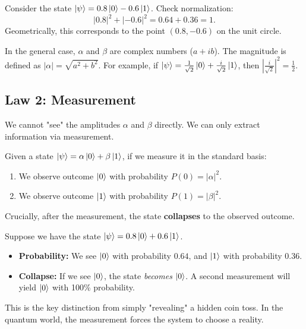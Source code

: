 \begin{example}
Consider the state $\ket{\psi} = 0.8\ket{0} - 0.6\ket{1}$.
Check normalization:
\[
    |0.8|^2 + |-0.6|^2 = 0.64 + 0.36 = 1.
\]
Geometrically, this corresponds to the point $(0.8, -0.6)$ on the unit circle.
\end{example}

\begin{remark}
In the general case, $\alpha$ and $\beta$ are complex numbers ($a + ib$). The magnitude is defined as $|\alpha| = \sqrt{a^2 + b^2}$. For example, if $\ket{\psi} = \frac{1}{\sqrt{2}}\ket{0} + \frac{i}{\sqrt{2}}\ket{1}$, then $|\frac{i}{\sqrt{2}}|^2 = \frac{1}{2}$.
\end{remark}

\subsection{Law 2: Measurement}
We cannot "see" the amplitudes $\alpha$ and $\beta$ directly. We can only extract information via measurement.

\begin{definition}
Given a state $\ket{\psi} = \alpha\ket{0} + \beta\ket{1}$, if we measure it in the standard basis:
\begin{enumerate}
    \item We observe outcome $\ket{0}$ with probability $P(0) = |\alpha|^2$.
    \item We observe outcome $\ket{1}$ with probability $P(1) = |\beta|^2$.
\end{enumerate}
Crucially, after the measurement, the state \textbf{collapses} to the observed outcome.
\end{definition} 
\begin{example}
    Suppose we have the state $\ket{\psi} = 0.8\ket{0} + 0.6\ket{1}$.
    \begin{itemize}
        \item \textbf{Probability:} We see $\ket{0}$ with probability $0.64$, and $\ket{1}$ with probability $0.36$.
        \item \textbf{Collapse:} If we see $\ket{0}$, the state \textit{becomes} $\ket{0}$. A second measurement will yield $\ket{0}$ with 100\% probability.
    \end{itemize}
\end{example}

This is the key distinction from simply "revealing" a hidden coin toss. In the quantum world, the measurement forces the system to choose a reality.

